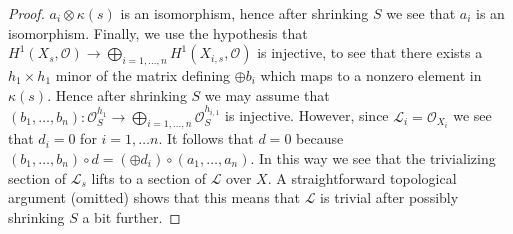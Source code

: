 \documentclass[10pt,a4paper]{amsart}
\theoremstyle{plain}
\theoremstyle{definition}
\theoremstyle{remark}
\numberwithin{equation}{subsection}
\begin{document}
\begin{proof}
$a_i \otimes \kappa(s)$ is an isomorphism, hence after shrinking $S$
we see that $a_i$ is an isomorphism. Finally, we use the hypothesis
that $H^1(X_s, \mathcal{O}) \to
\bigoplus_{i = 1, \ldots, n} H^1(X_{i, s}, \mathcal{O})$
is injective, to see that there exists a $h_1 \times h_1$ minor of the
matrix defining $\oplus b_i$ which maps to a nonzero
element in $\kappa(s)$. Hence after shrinking $S$ we may assume that
$(b_1, \ldots, b_n) : \mathcal{O}_S^{h_1}
\to \bigoplus_{i = 1, \ldots, n} \mathcal{O}_S^{h_{i, 1}}$
is injective. However, since $\mathcal{L}_i = \mathcal{O}_{X_i}$
we see that $d_i = 0$ for $i = 1, \ldots n$. It follows that $d = 0$
because $(b_1, \ldots, b_n) \circ d = (\oplus d_i) \circ (a_1, \ldots, a_n)$.
In this way we see
that the trivializing section of $\mathcal{L}_s$ lifts to a section
of $\mathcal{L}$ over $X$. A straightforward topological argument (omitted)
shows that this means that $\mathcal{L}$ is trivial after possibly
shrinking $S$ a bit further.
\end{proof}
\end{document}
